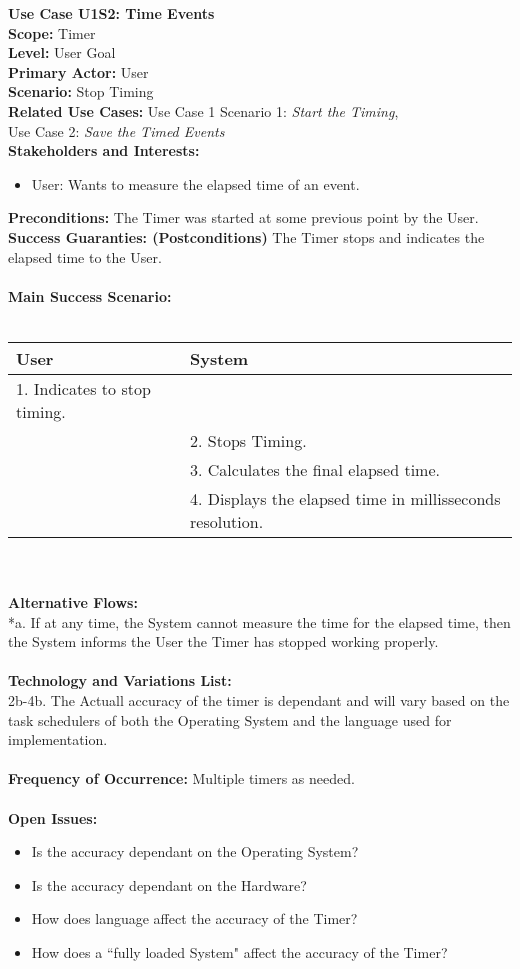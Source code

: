 \documentclass[letterpaper]{article}
\begin{document}
\noindent
\textbf{Use Case U1S2:  Time Events}\\
\textbf{Scope:  }Timer\\
\textbf{Level:  }User Goal\\
\textbf{Primary Actor:  }User\\
\textbf{Scenario:  }Stop Timing\\
\textbf{Related Use Cases:  }Use Case 1 Scenario 1:
\textit{Start the Timing},
\\Use Case 2:  \textit{Save the Timed Events}\\
\textbf{Stakeholders and Interests:}
\begin{itemize}
\item User:  Wants to measure the elapsed time of an event.
\end{itemize}
\textbf{Preconditions:  }The Timer was started at some previous
point by the User.\\
\textbf{Success Guaranties:  (Postconditions)} 
The Timer stops and indicates the elapsed time to the User.\\\\
\textbf{Main Success Scenario: }\\\\
\begin{tabular}{|p{6cm}|p{6cm}|}\hline
\textbf{User} & \textbf{System}\\\hline
1.  Indicates to stop timing. & \\\hline
&2.  Stops Timing.\\\hline
&3.  Calculates the final elapsed time.\\\hline
&4.  Displays the elapsed time in millisseconds resolution.\\\hline
\end{tabular}\\\\
\textbf{Alternative Flows:  }\\
*a.  If at any time, the System cannot measure the time for the
elapsed time, then the System informs the User the Timer has
stopped working properly.\\\\
\textbf{Technology and Variations List:  }\\
2b-4b.  The Actuall accuracy of the timer is dependant and
will vary based on the task schedulers of both the Operating
System and the language used for implementation.\\\\
\textbf{Frequency of Occurrence:  }Multiple timers as needed.\\\\
\textbf{Open Issues:  }\\
\begin{itemize}
\item Is the accuracy dependant on the Operating System?
\item Is the accuracy dependant on the Hardware?
\item How does language affect the accuracy of the Timer?
\item How does a ``fully loaded System" affect the accuracy
of the Timer?
\end{itemize}
\end{document}
